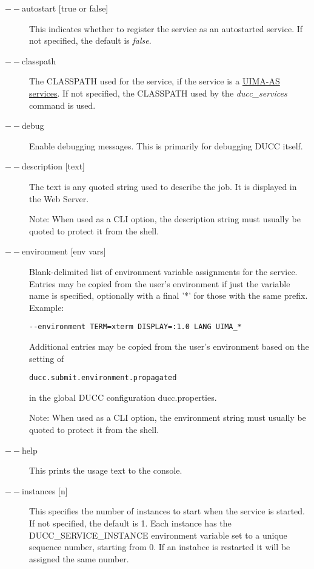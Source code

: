     \begin{description}

        \item[$--$autostart {[true or false]}] This indicates whether to register the service as
          an autostarted service.  If not specified, the default is {\em false}.

        \item[$--$classpath] The CLASSPATH used for the service, if the service is a
          \hyperref[sec:services.types]{UIMA-AS services}.  If not specified, the CLASSPATH used
          by the {\em ducc\_services} command is used.

        \item[$--$debug ]
          Enable debugging messages. This is primarily for debugging DUCC itself. 
          
        \item[$--$description {[text]}] The text is any quoted string used to describe the job. It is
          displayed in the Web Server.

          Note: When used as a CLI option, the description string must usually be quoted to protect
          it from the shell.
    
        \item[$--$environment {[env vars]}] Blank-delimited list of environment variable
          assignments for the service.
          Entries may be copied from the user's environment if just the variable name is
          specified, optionally with a final '*' for those with the same prefix. Example:
          \begin{verbatim}
--environment TERM=xterm DISPLAY=:1.0 LANG UIMA_*
          \end{verbatim}

          Additional entries may be copied from the user's environment based on the setting of
\begin{verbatim}
ducc.submit.environment.propagated
\end{verbatim}
          in the global DUCC configuration ducc.properties.
        
          Note: When used as a CLI option, the environment string must usually be
          quoted to protect it from the shell.
          
        \item[$--$help ] This prints the usage text to the console.

         \item[$--$instances {[n]}] This specifies the number of instances to start when the service
           is started.  If not specified, the default is 1.
           Each instance has the DUCC_SERVICE_INSTANCE environment variable set to a unique sequence
           number, starting from 0.
           If an instabce is restarted it will be assigned the same number.


\end{description}
